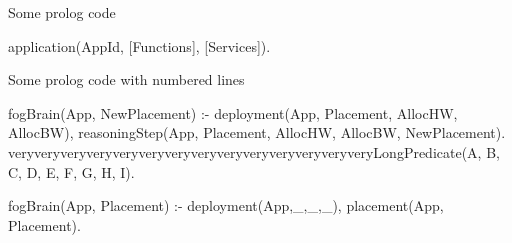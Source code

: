 \documentclass{article}
\author{}
\title{}
\begin{document}
Some prolog code

\begin{code}
	application(AppId, [Functions], [Services]).
\end{code}

Some prolog code with numbered lines

\begin{codenum}[firstnumber=1, breaklines]
	fogBrain(App, NewPlacement) :-
	deployment(App, Placement, AllocHW, AllocBW),
	reasoningStep(App, Placement, AllocHW, AllocBW, NewPlacement).
	veryveryveryveryveryveryveryveryveryveryveryveryveryveryLongPredicate(A, B, C, D, E, F, G, H, I).

	fogBrain(App, Placement) :-
	\+deployment(App,_,_,_),
	placement(App, Placement).
\end{codenum}
\end{document}
